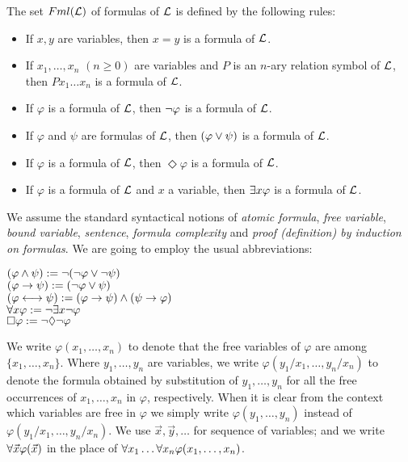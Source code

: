 \begin{defn}
The set $Fml(\mathcal{L})$ of formulas of $\mathcal{L}$ is defined by the following rules:  
\begin{itemize} 
\item If $x, y$ are variables, then $x =y$ is a formula of $\mathcal{L}$.
\item If $x_1, \dots, x_n$ $(n \geq 0)$  are variables and $P$ is an $n$-ary relation symbol of $\mathcal{L}$, then $Px_1 \dots x_n$ is a formula of $\mathcal{L}$.
\item If $\varphi$ is a formula of $\mathcal{L}$, then $\neg \varphi$ is a formula of $\mathcal{L}$.
\item If $\varphi$ and $\psi$ are formulas of $\mathcal{L}$, then $(\varphi \vee \psi)$ is a formula of $\mathcal{L}$.
\item If $\varphi$ is a formula of $\mathcal{L}$, then $\Diamond \varphi$ is a formula of $\mathcal{L}$.
\item If $\varphi$ is a formula of $\mathcal{L}$ and $x$ a variable, then $\exists x \varphi$ is a formula of $\mathcal{L}$.
\end{itemize}
\qquad We assume the standard syntactical notions of \textit{atomic formula}, \textit{free variable}, \textit{bound variable}, \textit{sentence}, \textit{formula complexity} and \textit{proof (definition) by induction on formulas}. We are going to employ the usual abbreviations: 

\begin{center}	
$(\varphi \wedge \psi) := \neg (\neg \varphi \vee \neg \psi)$\\
$(\varphi \rightarrow \psi) := (\neg \varphi \vee \psi)$\\
$(\varphi \longleftrightarrow \psi) := (\varphi \rightarrow \psi)\wedge (\psi \rightarrow \varphi)$\\
$\forall x \varphi := \neg\exists x \neg \varphi$\\
$\Box \varphi := \neg\Diamond \neg \varphi$\\
\end{center}

\qquad We write $\varphi(x_{1}, \dots, x_{n})$ to denote that the free variables of $\varphi$ are among $\{x_{1}, \dots, x_{n}\}$. Where $y_{1}, \dots, y_{n}$ are variables, we write $\varphi(y_{1}/x_{1}, \dots, y_{n}/x_{n})$ to denote the formula obtained by substitution of $y_{1}, \dots, y_{n}$ for all the free occurrences of $x_{1}, \dots, x_{n}$ in $\varphi$,  respectively. When it is clear from the context which variables are free in $\varphi$ we simply write $\varphi(y_{1}, \dots, y_{n})$ instead of $\varphi(y_{1}/x_{1}, \dots, y_{n}/x_{n})$. We use $\vec{x},\vec{y}, \dots$ for sequence of variables; and we write $\forall \vec{x} \varphi(\vec{x})$ in the place of $\forall x_1 \dots \forall x_n\varphi(x_1, \dots ,x_n)$. 
\end{defn}


